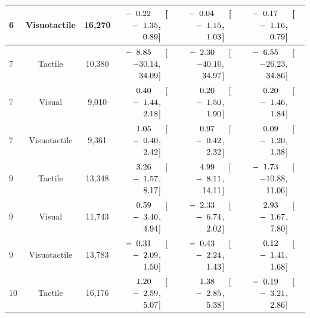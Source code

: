 \begin{table}[htbp]
{\begin{tabular}{lccccc}
6 & Visuotactile & 16,270 & $-\hphantom{0}0.22^{\hphantom{***}}$ [$-\hphantom{0}1.35$, $\hphantom{-}\hphantom{0}0.89$] & $-\hphantom{0}0.04^{\hphantom{***}}$ [$-\hphantom{0}1.15$, $\hphantom{-}\hphantom{0}1.03$] & $-\hphantom{0}0.17^{\hphantom{***}}$ [$-\hphantom{0}1.16$, $\hphantom{-}\hphantom{0}0.79$] \\
\midrule
7 & Tactile & 10,380 & $-\hphantom{0}8.85^{\hphantom{***}}$ [$-30.14$, $\hphantom{-}34.09$] & $-\hphantom{0}2.30^{\hphantom{***}}$ [$-40.10$, $\hphantom{-}34.97$] & $-\hphantom{0}6.55^{\hphantom{***}}$ [$-26.23$, $\hphantom{-}34.86$] \\
7 & Visual & 9,010 & $\hphantom{-}\hphantom{0}0.40^{\hphantom{***}}$ [$-\hphantom{0}1.44$, $\hphantom{-}\hphantom{0}2.18$] & $\hphantom{-}\hphantom{0}0.20^{\hphantom{***}}$ [$-\hphantom{0}1.50$, $\hphantom{-}\hphantom{0}1.90$] & $\hphantom{-}\hphantom{0}0.20^{\hphantom{***}}$ [$-\hphantom{0}1.46$, $\hphantom{-}\hphantom{0}1.84$] \\
7 & Visuotactile & 9,361 & $\hphantom{-}\hphantom{0}1.05^{\hphantom{***}}$ [$-\hphantom{0}0.40$, $\hphantom{-}\hphantom{0}2.42$] & $\hphantom{-}\hphantom{0}0.97^{\hphantom{***}}$ [$-\hphantom{0}0.42$, $\hphantom{-}\hphantom{0}2.32$] & $\hphantom{-}\hphantom{0}0.09^{\hphantom{***}}$ [$-\hphantom{0}1.20$, $\hphantom{-}\hphantom{0}1.38$] \\
\midrule
9 & Tactile & 13,348 & $\hphantom{-}\hphantom{0}3.26^{\hphantom{***}}$ [$-\hphantom{0}1.57$, $\hphantom{-}\hphantom{0}8.17$] & $\hphantom{-}\hphantom{0}4.99^{\hphantom{***}}$ [$-\hphantom{0}8.11$, $\hphantom{-}14.11$] & $-\hphantom{0}1.73^{\hphantom{***}}$ [$-10.88$, $\hphantom{-}11.06$] \\
9 & Visual & 11,743 & $\hphantom{-}\hphantom{0}0.59^{\hphantom{***}}$ [$-\hphantom{0}3.40$, $\hphantom{-}\hphantom{0}4.94$] & $-\hphantom{0}2.33^{\hphantom{***}}$ [$-\hphantom{0}6.74$, $\hphantom{-}\hphantom{0}2.02$] & $\hphantom{-}\hphantom{0}2.93^{\hphantom{***}}$ [$-\hphantom{0}1.67$, $\hphantom{-}\hphantom{0}7.80$] \\
9 & Visuotactile & 13,783 & $-\hphantom{0}0.31^{\hphantom{***}}$ [$-\hphantom{0}2.09$, $\hphantom{-}\hphantom{0}1.50$] & $-\hphantom{0}0.43^{\hphantom{***}}$ [$-\hphantom{0}2.24$, $\hphantom{-}\hphantom{0}1.43$] & $\hphantom{-}\hphantom{0}0.12^{\hphantom{***}}$ [$-\hphantom{0}1.41$, $\hphantom{-}\hphantom{0}1.68$] \\
\midrule
10 & Tactile & 16,176 & $\hphantom{-}\hphantom{0}1.20^{\hphantom{***}}$ [$-\hphantom{0}2.59$, $\hphantom{-}\hphantom{0}5.07$] & $\hphantom{-}\hphantom{0}1.38^{\hphantom{***}}$ [$-\hphantom{0}2.85$, $\hphantom{-}\hphantom{0}5.38$] & $-\hphantom{0}0.19^{\hphantom{***}}$ [$-\hphantom{0}3.21$, $\hphantom{-}\hphantom{0}2.86$] \\

\end{tabular}}
\end{table}
